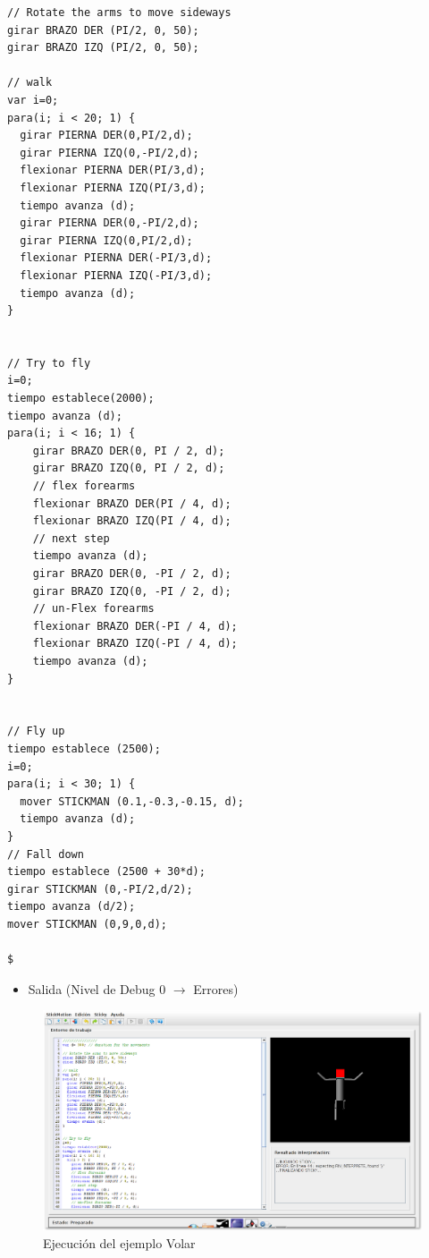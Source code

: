 \documentclass[a4paper, 12pt]{book}
\begin{document}
\begin{itemize}
\begin{verbatim}
// Rotate the arms to move sideways
girar BRAZO DER (PI/2, 0, 50);
girar BRAZO IZQ (PI/2, 0, 50);

// walk
var i=0;
para(i; i < 20; 1) {  
  girar PIERNA DER(0,PI/2,d);
  girar PIERNA IZQ(0,-PI/2,d);
  flexionar PIERNA DER(PI/3,d);
  flexionar PIERNA IZQ(PI/3,d);
  tiempo avanza (d);
  girar PIERNA DER(0,-PI/2,d);
  girar PIERNA IZQ(0,PI/2,d);
  flexionar PIERNA DER(-PI/3,d);
  flexionar PIERNA IZQ(-PI/3,d);
  tiempo avanza (d);  
}


// Try to fly
i=0;
tiempo establece(2000);
tiempo avanza (d);
para(i; i < 16; 1) {    
    girar BRAZO DER(0, PI / 2, d);
    girar BRAZO IZQ(0, PI / 2, d);
    // flex forearms
    flexionar BRAZO DER(PI / 4, d);
    flexionar BRAZO IZQ(PI / 4, d);
    // next step
    tiempo avanza (d);
    girar BRAZO DER(0, -PI / 2, d);
    girar BRAZO IZQ(0, -PI / 2, d);
    // un-Flex forearms
    flexionar BRAZO DER(-PI / 4, d);
    flexionar BRAZO IZQ(-PI / 4, d);
    tiempo avanza (d);
} 


// Fly up
tiempo establece (2500);
i=0;
para(i; i < 30; 1) {
  mover STICKMAN (0.1,-0.3,-0.15, d);
  tiempo avanza (d);
}
// Fall down
tiempo establece (2500 + 30*d);
girar STICKMAN (0,-PI/2,d/2);
tiempo avanza (d/2);
mover STICKMAN (0,9,0,d);

$
\end{verbatim}
  
  
  
  \begin{itemize}
\item Salida (Nivel de Debug 0 $\rightarrow$ Errores)
\end{itemize}
\begin{figure}[htb]
  \centerline{\includegraphics[width=\textwidth]{./imagenes/volar1.png}}
  \caption{Ejecución del ejemplo Volar}
\end{figure}



\end{itemize}
\end{document}
